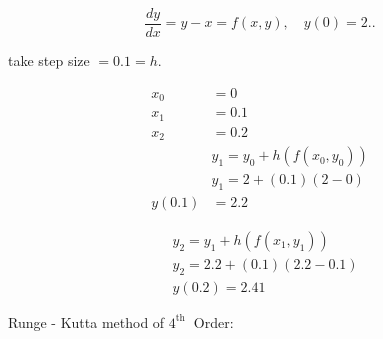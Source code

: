 \documentclass[12pt]{exam}
\begin{document}
\begin{questions}
\begin{parts}
    \begin{solution}
        $$
        \frac{d y}{d x}=y-x=f(x, y), \quad y(0)=2 . .
        $$
        
        take step size $=0.1=h$.
        
        $$
        \begin{aligned}
        x_{0} & =0 \\
        x_{1} & =0.1 \\
        x_{2} & =0.2 \\
        & y_{1}=y_{0}+h\left(f\left(x_{0}, y_{0}\right)\right) \\
        & y_{1}=2+(0.1)(2-0) \\
        y(0.1) & =2.2
        \end{aligned}
        $$
        
        $$
        \begin{aligned}
        & y_{2}=y_{1}+h\left(f\left(x_{1}, y_{1}\right)\right) \\
        & y_{2}=2.2+(0.1)(2.2-0.1) \\
        & y(0.2)=2.41
        \end{aligned}
        $$
    \end{solution}
\end{parts}

\newpage

\question Runge - Kutta method of $4^{\text {th }}$ Order:\\
\end{questions}
\end{document}
